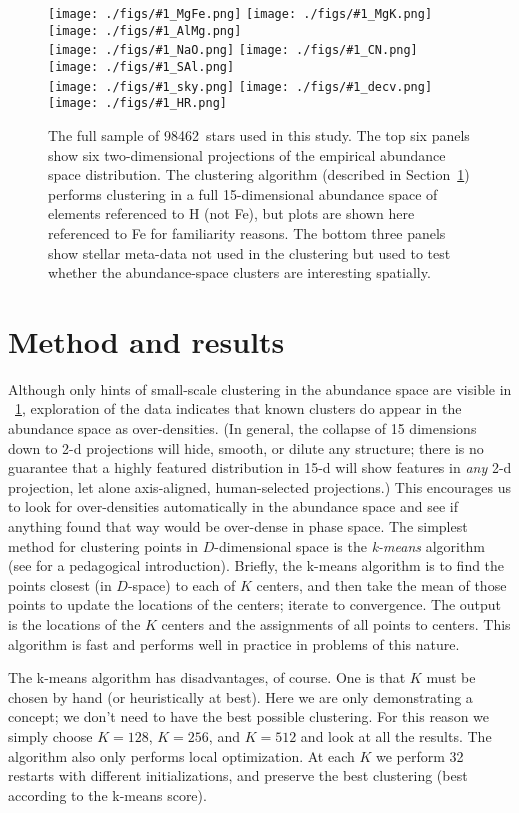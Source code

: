 \documentclass[12pt, letterpaper, preprint]{aastex}
\newcommand{\sectionname}{Section}
\newcommand{\insanefigure}[1]{%
\texttt{[image: ./figs/\#1\_MgFe.png]}%
\texttt{[image: ./figs/\#1\_MgK.png]}%
\texttt{[image: ./figs/\#1\_AlMg.png]}\\
\texttt{[image: ./figs/\#1\_NaO.png]}%
\texttt{[image: ./figs/\#1\_CN.png]}%
\texttt{[image: ./figs/\#1\_SAl.png]}\\
\texttt{[image: ./figs/\#1\_sky.png]}%
\texttt{[image: ./figs/\#1\_decv.png]}%
\texttt{[image: ./figs/\#1\_HR.png]}}
\newcommand{\totalnumber}{98462} %
\begin{document}
\begin{figure}[!p]
\insanefigure{all}
\caption{The full sample of \totalnumber\ stars used in this study.
  The top six panels show six two-dimensional projections of the
  empirical abundance space distribution.
  The clustering algorithm (described in
  \sectionname~\ref{sec:method}) performs clustering in a full
  15-dimensional abundance space of elements referenced to H (not Fe),
  but plots are shown here referenced to Fe for familiarity reasons.
  The bottom three panels show stellar meta-data not used in the
  clustering but used to test whether the abundance-space clusters
  are interesting spatially.\label{fig:all}}
\end{figure}

\clearpage
\section{Method and results}\label{sec:method}

Although only hints of small-scale clustering in the abundance space
are visible in \figurename~\ref{fig:all}, exploration of the data indicates that
known clusters do appear in the abundance space as over-densities.
(In general, the collapse of 15 dimensions down to 2-d projections
will hide, smooth, or dilute any structure; there is no guarantee that
a highly featured distribution in 15-d will show features in
\emph{any} 2-d projection, let alone axis-aligned, human-selected projections.)
This encourages us to look for over-densities automatically in the
abundance space and see if anything found that way would be over-dense
in phase space.
The simplest method for clustering points in $D$-dimensional space is
the \emph{k-means} algorithm (see \citealt{bishop} for a pedagogical introduction).
Briefly, the k-means algorithm is to find the points closest (in
$D$-space) to each of $K$ centers, and then take the mean of those
points to update the locations of the centers; iterate to convergence.
The output is the locations of the $K$ centers and the assignments of
all points to centers.
This algorithm is fast and performs well in practice in problems of
this nature.

The k-means algorithm has disadvantages, of course.
One is that $K$ must be chosen by hand (or heuristically at best).
Here we are only demonstrating a concept; we don't need to have the
best possible clustering.
For this reason we simply choose $K=128$, $K=256$, and $K=512$ and look at all the
results.
The algorithm also only performs local optimization.
At each $K$ we perform 32 restarts with different initializations, and
preserve the best clustering (best according to the k-means score).
\end{document}
